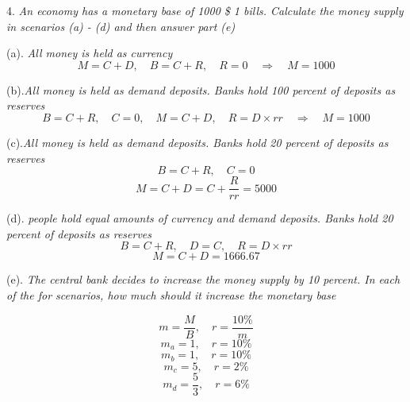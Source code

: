 \documentclass[10pt, a4paper]{article}
\begin{document}
\medskip

4. \emph{An economy has a monetary base of 1000 \$ 1 bills. Calculate the money supply in scenarios (a) - (d) and then answer part (e)}

(a). \emph{All money is held as currency}
$$M = C + D, \quad B = C + R, \quad R = 0 \quad \Rightarrow \quad M = 1000$$

(b).\emph{All money is held as demand deposits. Banks hold 100 percent of deposits as reserves}
$$B = C + R, \quad C = 0,\quad M = C + D,\quad R = D \times rr\quad \Rightarrow\quad  M = 1000$$

(c).\emph{All money is held as demand deposits. Banks hold 20 percent of deposits as reserves}
$$B = C + R,\quad C = 0$$
$$M = C + D = C + \frac{R}{rr} = 5000$$

(d). \emph{people hold equal amounts of currency and demand deposits. Banks hold 20 percent of deposits as reserves}
$$B = C + R,\quad D = C, \quad R = D \times rr$$
$$M = C + D = 1666.67$$

(e). \emph{The central bank decides to increase the money supply by 10 percent. In each of the for scenarios, how much should it increase the monetary base}

$$m = \frac{M}{B},\quad r = \frac{10\%}{m}$$
$$m_a = 1,\quad r = 10\%$$
$$m_b = 1, \quad r = 10\%$$
$$m_c = 5, \quad r = 2\%$$
$$m_d = \frac{5}{3},\quad r = 6\%$$
\end{document}
